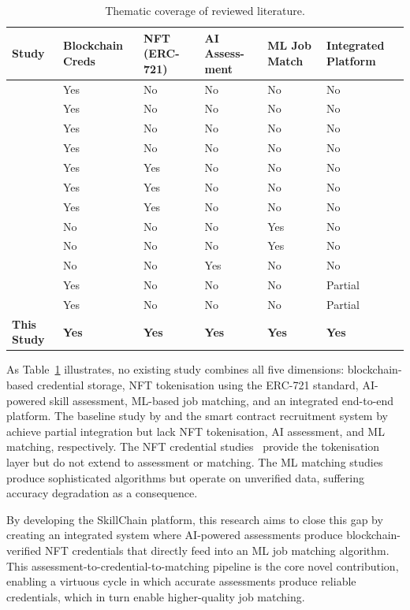 \begin{table}[htb]
\centering
\caption{Thematic coverage of reviewed literature.}
\label{tbl:literature_comparison}
\vspace{.5em}
\small
\begin{tabular}{|p{2.8cm}|p{1.6cm}|p{1.4cm}|p{1.5cm}|p{1.4cm}|p{1.8cm}|}
    \hline
    \textbf{Study} & \textbf{Blockchain Creds} & \textbf{NFT (ERC-721)} & \textbf{AI Assess-ment} & \textbf{ML Job Match} & \textbf{Integrated Platform} \\ \hline
    \citet{Karatas2018} & Yes & No & No & No & No \\ \hline
    \citet{Nousias2022} & Yes & No & No & No & No \\ \hline
    \citet{Moya2025} & Yes & No & No & No & No \\ \hline
    \citet{Alsobhi2023} & Yes & No & No & No & No \\ \hline
    \citet{Zhao2022} & Yes & Yes & No & No & No \\ \hline
    \citet{Khati2023} & Yes & Yes & No & No & No \\ \hline
    \citet{Aung2024} & Yes & Yes & No & No & No \\ \hline
    \citet{Qin2020} & No & No & No & Yes & No \\ \hline
    \citet{Shen2024} & No & No & No & Yes & No \\ \hline
    \citet{Bian2020} & No & No & Yes & No & No \\ \hline
    \citet{Bedi2023} & Yes & No & No & No & Partial \\ \hline
    \citet{Liu2020} & Yes & No & No & No & Partial \\ \hline
    \textbf{This Study} & \textbf{Yes} & \textbf{Yes} & \textbf{Yes} & \textbf{Yes} & \textbf{Yes} \\ \hline
\end{tabular}
\end{table}

As Table~\ref{tbl:literature_comparison} illustrates, no existing study combines all five dimensions: blockchain-based credential storage, NFT tokenisation using the ERC-721 standard, AI-powered skill assessment, ML-based job matching, and an integrated end-to-end platform. The baseline study by \citet{Liu2020} and the smart contract recruitment system by \citet{Bedi2023} achieve partial integration but lack NFT tokenisation, AI assessment, and ML matching, respectively. The NFT credential studies~\citep{Zhao2022,Khati2023,Aung2024} provide the tokenisation layer but do not extend to assessment or matching. The ML matching studies~\citep{Qin2020,Shen2024,Bian2020} produce sophisticated algorithms but operate on unverified data, suffering accuracy degradation as a consequence.

By developing the SkillChain platform, this research aims to close this gap by creating an integrated system where AI-powered assessments produce blockchain-verified NFT credentials that directly feed into an ML job matching algorithm. This assessment-to-credential-to-matching pipeline is the core novel contribution, enabling a virtuous cycle in which accurate assessments produce reliable credentials, which in turn enable higher-quality job matching.
